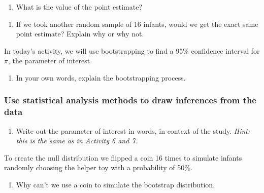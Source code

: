 \documentclass[
]{report}
\providecommand{\tightlist}{%
  \setlength{\itemsep}{0pt}\setlength{\parskip}{0pt}}
\begin{document}
\begin{enumerate}
\def\labelenumi{\arabic{enumi}.}
\tightlist
\item
  What is the value of the point estimate?
\end{enumerate}

\vspace{0.3in}

\begin{enumerate}
\def\labelenumi{\arabic{enumi}.}
\setcounter{enumi}{1}
\tightlist
\item
  If we took another random sample of 16 infants, would we get the exact same point estimate? Explain why or why not.
\end{enumerate}

\vspace{0.5in}

In today's activity, we will use bootstrapping to find a 95\% confidence interval for \(\pi\), the parameter of interest.

\begin{enumerate}
\def\labelenumi{\arabic{enumi}.}
\setcounter{enumi}{2}
\tightlist
\item
  In your own words, explain the bootstrapping process.
  \vspace{0.5in}
\end{enumerate}

\subsubsection*{Use statistical analysis methods to draw inferences from the data}\label{use-statistical-analysis-methods-to-draw-inferences-from-the-data-1}

\begin{enumerate}
\def\labelenumi{\arabic{enumi}.}
\setcounter{enumi}{3}
\tightlist
\item
  Write out the parameter of interest in words, in context of the study. \emph{Hint: this is the same as in Activity 6 and 7.}
\end{enumerate}

\vspace{0.5in}

To create the null distribution we flipped a coin 16 times to simulate infants randomly choosing the helper toy with a probability of 50\%.

\begin{enumerate}
\def\labelenumi{\arabic{enumi}.}
\setcounter{enumi}{4}
\tightlist
\item
  Why can't we use a coin to simulate the bootstrap distribution.
\end{enumerate}
\end{document}
